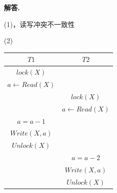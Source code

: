 \documentclass[12pt, a4paper, oneside]{ctexart}
\newenvironment{solution}{\par\noindent\textbf{解答. }}{\par}
\begin{document}
\begin{solution}

    (1)，读写冲突不一致性

    (2)\quad

    \begin{table}[H]
        \begin{center}

            \begin{tabular}{|c|c|}
                \hline
                $T1$                  & $T2$                  \\
                \hline
                $lock(X)$             &                       \\
                \hline
                $a\leftarrow Read(X)$ &                       \\
                \hline
                                      & $lock(X)$             \\
                \hline
                                      & $a\leftarrow Read(X)$ \\
                \hline
                $a=a-1$               &                       \\
                \hline
                $Write(X,a)$          &                       \\
                \hline
                $Unlock(X)$           &                       \\
                \hline
                                      & $a=a-2$               \\
                \hline
                                      & $Write(X,a)$          \\
                \hline
                                      & $Unlock(X)$           \\
                \hline
            \end{tabular}

        \end{center}
    \end{table}
\end{solution}
\end{document}
